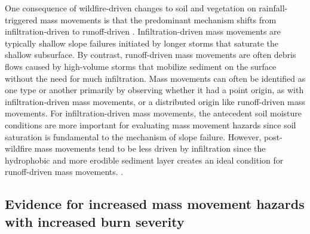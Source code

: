 \documentclass[nhess, manuscript]{copernicus}
\begin{document}
One consequence of wildfire-driven changes to soil and vegetation on rainfall-triggered mass movements is that the predominant mechanism shifts from infiltration-driven to runoff-driven \citep{cannonWildfirerelatedDebrisFlow2005}. Infiltration-driven mass movements are typically shallow slope failures initiated by longer storms that saturate the shallow subsurface. By contrast, runoff-driven mass movements are often debris flows caused by high-volume storms that mobilize sediment on the surface without the need for much infiltration. Mass movements can often be identified as one type or another primarily by observing whether it had a point origin, as with infiltration-driven mass movements, or a distributed origin like runoff-driven mass movements. For infiltration-driven mass movements, the antecedent soil moisture conditions are more important for evaluating mass movement hazards since soil saturation is fundamental to the mechanism of slope failure. However, post-wildfire mass movements tend to be less driven by infiltration since the hydrophobic and more erodible sediment layer creates an ideal condition for runoff-driven mass movements. \citep{cannonStormRainfallConditions2008,santi2020wildfire,parise2012wildfire}.

\subsection{Evidence for increased mass movement hazards with increased burn
severity}\label{evidence-for-increased-mass movement-hazards-with-increased-burn-severity}
\end{document}
